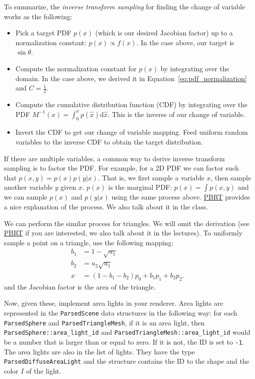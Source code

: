 To summarize, the \emph{inverse transform sampling} for finding the change of variable works as the following:
\begin{itemize}
    \item Pick a target PDF $p(x)$ (which is our desired Jacobian factor) up to a normalization constant: $p(x) \propto f(x)$. In the case above, our target is $\sin\theta$.
    \item Compute the normalization constant for $p(x)$ by integrating over the domain. In the case above, we derived it in Equation~\eqref{eq:pdf_normalization} and $C = \frac{1}{2}$.
    \item Compute the cumulative distribution function (CDF) by integrating over the PDF $M^{-1}(x) = \int_{0}^{x}p(\hat{x})\mathrm{d}\hat{x}$. This is the inverse of our change of variable.
    \item Invert the CDF to get our change of variable mapping. Feed uniform random variables to the inverse CDF to obtain the target distribution.
\end{itemize}
If there are multiple variables, a common way to derive inverse transform sampling is to factor the PDF. For example, for a 2D PDF we can factor such that $p(x, y) = p(x)p(y|x)$. That is, we first sample a variable $x$, then sample another variable $y$ given $x$. $p(x)$ is the marginal PDF: $p(x) = \int p(x, y)$ and we can sample $p(x)$ and $p(y|x)$ using the same process above. \href{https://www.pbr-book.org/3ed-2018/Monte_Carlo_Integration/2D_Sampling_with_Multidimensional_Transformations}{PBRT} provides a nice explanation of the process. We also talk about it in the class.

We can perform the similar process for triangles. We will omit the derivation (see \href{https://www.pbr-book.org/3ed-2018/Monte_Carlo_Integration/2D_Sampling_with_Multidimensional_Transformations#SamplingaTriangle}{PBRT} if you are interested, we also talk about it in the lectures). To uniformly sample a point on a triangle, use the following mapping:
\begin{equation}
\begin{aligned}
b_1 &= 1 - \sqrt{u_1} \\
b_2 &= u_2 \sqrt{u_1} \\
x &= (1 - b_1 - b_2) p_0 + b_1 p_1 + b_2 p_2.
\end{aligned}
\end{equation}
and the Jacobian factor is the area of the triangle.

Now, given these, implement area lights in your renderer. Area lights are represented in the \lstinline{ParsedScene} data structures in the following way: for each \lstinline{ParsedSphere} and \lstinline{ParsedTriangleMesh}, if it is an area light, then \lstinline{ParsedSphere::area_light_id} and \lstinline{ParsedTriangleMesh::area_light_id} would be a number that is larger than or equal to zero. If it is not, the ID is set to \lstinline{-1}. The area lights are also in the list of lights. They have the type \lstinline{ParsedDiffuseAreaLight} and the structure contains the ID to the shape and the color $I$ of the light.

